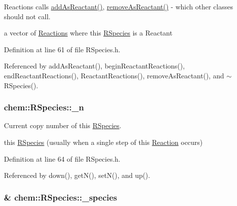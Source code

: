 Reactions calls \hyperlink{classchem_1_1RSpecies_a2f69141d801e4660ab411953fef74ea2}{add\-As\-Reactant()}, \hyperlink{classchem_1_1RSpecies_ab8f32e15791cfddea7cf4cac5a39c0fa}{remove\-As\-Reactant()} -\/ which other classes should not call. 

a vector of \hyperlink{classchem_1_1Reaction}{Reactions} where this \hyperlink{classchem_1_1RSpecies}{R\-Species} is a Reactant 

Definition at line 61 of file R\-Species.\-h.



Referenced by add\-As\-Reactant(), begin\-Reactant\-Reactions(), end\-Reactant\-Reactions(), Reactant\-Reactions(), remove\-As\-Reactant(), and $\sim$\-R\-Species().

\hypertarget{classchem_1_1RSpecies_a60e53ebfe464923452c54322dfd479dc}{
\subsubsection[{\-\_\-n}]{ {\bf chem\-::\-R\-Species\-::\-\_\-n}}}\label{classchem_1_1RSpecies_a60e53ebfe464923452c54322dfd479dc}


Current copy number of this \hyperlink{classchem_1_1RSpecies}{R\-Species}. 

this \hyperlink{classchem_1_1RSpecies}{R\-Species} (usually when a single step of this \hyperlink{classchem_1_1Reaction}{Reaction} occurs) 

Definition at line 64 of file R\-Species.\-h.



Referenced by down(), get\-N(), set\-N(), and up().

\hypertarget{classchem_1_1RSpecies_a3a979b9226800417c7aad81a2162fac5}{
\subsubsection[{\-\_\-species}]{\& {\bf chem\-::\-R\-Species\-::\-\_\-species}}}\label{classchem_1_1RSpecies_a3a979b9226800417c7aad81a2162fac5}


